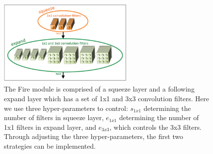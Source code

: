 \documentclass[a4paper]{article}
\begin{document}
\begin{figure}
\centering
\includegraphics[width=0.6\textwidth]{squeeze1.png}
\caption{\label{squeeze}The Fire module is comprised of a squeeze layer and a following expand layer which has a set of 1x1 and 3x3 convolution filters. Here we use three hyper-parameters to control: $s_{1x1}$ determining the number of filters in squeeze layer, $e_{1x1}$ determining the number of 1x1 filters in expand layer, and $e_{3x3}$, which controls the 3x3 filters. Through adjusting the three hyper-parameters, the first two strategies can be implemented.}
\end{figure}
\end{document}

